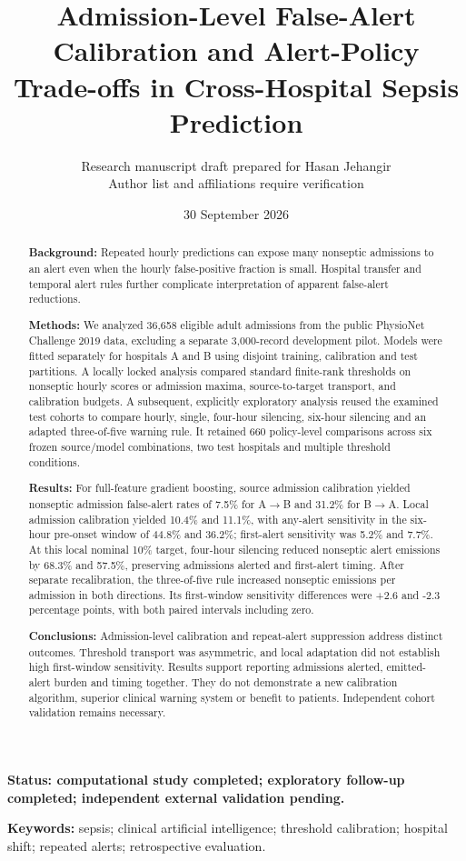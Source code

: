 \documentclass[11pt,a4paper]{article}
\title{Admission-Level False-Alert Calibration and Alert-Policy Trade-offs in Cross-Hospital Sepsis Prediction}
\author{Research manuscript draft prepared for Hasan Jehangir\\\small Author list and affiliations require verification}
\date{30 September 2026}
\begin{document}
\maketitle
\begin{center}\small\textbf{Status: computational study completed; exploratory follow-up completed; independent external validation pending.}\end{center}
\begin{abstract}
\textbf{Background:} Repeated hourly predictions can expose many nonseptic admissions to an alert even when the hourly false-positive fraction is small. Hospital transfer and temporal alert rules further complicate interpretation of apparent false-alert reductions.

\textbf{Methods:} We analyzed 36,658 eligible adult admissions from the public PhysioNet Challenge 2019 data, excluding a separate 3,000-record development pilot. Models were fitted separately for hospitals A and B using disjoint training, calibration and test partitions. A locally locked analysis compared standard finite-rank thresholds on nonseptic hourly scores or admission maxima, source-to-target transport, and calibration budgets. A subsequent, explicitly exploratory analysis reused the examined test cohorts to compare hourly, single, four-hour silencing, six-hour silencing and an adapted three-of-five warning rule. It retained 660 policy-level comparisons across six frozen source/model combinations, two test hospitals and multiple threshold conditions.

\textbf{Results:} For full-feature gradient boosting, source admission calibration yielded nonseptic admission false-alert rates of 7.5\% for A$\to$B and 31.2\% for B$\to$A. Local admission calibration yielded 10.4\% and 11.1\%, with any-alert sensitivity in the six-hour pre-onset window of 44.8\% and 36.2\%; first-alert sensitivity was 5.2\% and 7.7\%. At this local nominal 10\% target, four-hour silencing reduced nonseptic alert emissions by 68.3\% and 57.5\%, preserving admissions alerted and first-alert timing. After separate recalibration, the three-of-five rule increased nonseptic emissions per admission in both directions. Its first-window sensitivity differences were +2.6 and -2.3 percentage points, with both paired intervals including zero.

\textbf{Conclusions:} Admission-level calibration and repeat-alert suppression address distinct outcomes. Threshold transport was asymmetric, and local adaptation did not establish high first-window sensitivity. Results support reporting admissions alerted, emitted-alert burden and timing together. They do not demonstrate a new calibration algorithm, superior clinical warning system or benefit to patients. Independent cohort validation remains necessary.
\end{abstract}
\textbf{Keywords:} sepsis; clinical artificial intelligence; threshold calibration; hospital shift; repeated alerts; retrospective evaluation.
\end{document}
